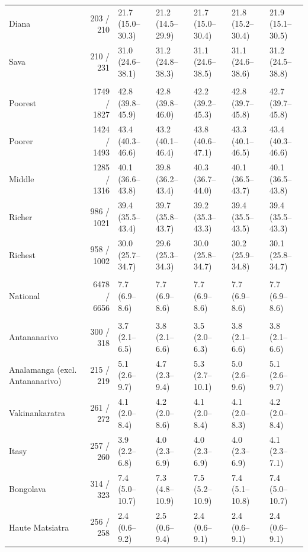 \documentclass[11pt,a4paper]{article}
\begin{document}
\begin{landscape}
\begin{longtable}{l|rlllll}
Diana & 203 / 210 & 21.7 (15.0–30.3) & 21.2 (14.5–29.9) & 21.7 (15.0–30.4) & 21.8 (15.2–30.4) & 21.9 (15.1–30.5) \\ 
Sava & 210 / 231 & 31.0 (24.6–38.1) & 31.2 (24.8–38.3) & 31.1 (24.6–38.5) & 31.1 (24.6–38.6) & 31.2 (24.5–38.8) \\ 
\midrule\addlinespace[2.5pt]
\multicolumn{7}{l}{Stunting — Wealth quintile} \\[2.5pt] 
\midrule\addlinespace[2.5pt]
Poorest & 1749 / 1827 & 42.8 (39.8–45.9) & 42.8 (39.8–46.0) & 42.2 (39.2–45.3) & 42.8 (39.7–45.8) & 42.7 (39.7–45.8) \\ 
Poorer & 1424 / 1493 & 43.4 (40.3–46.6) & 43.2 (40.1–46.4) & 43.8 (40.6–47.1) & 43.3 (40.1–46.5) & 43.4 (40.3–46.6) \\ 
Middle & 1285 / 1316 & 40.1 (36.6–43.8) & 39.8 (36.2–43.4) & 40.3 (36.7–44.0) & 40.1 (36.5–43.7) & 40.1 (36.5–43.8) \\ 
Richer & 986 / 1021 & 39.4 (35.5–43.4) & 39.7 (35.8–43.7) & 39.2 (35.3–43.3) & 39.4 (35.5–43.5) & 39.4 (35.5–43.3) \\ 
Richest & 958 / 1002 & 30.0 (25.7–34.7) & 29.6 (25.3–34.3) & 30.0 (25.8–34.7) & 30.2 (25.9–34.8) & 30.1 (25.8–34.7) \\ 
\midrule\addlinespace[2.5pt]
\multicolumn{7}{l}{Wasting — National} \\[2.5pt] 
\midrule\addlinespace[2.5pt]
National & 6478 / 6656 & 7.7 (6.9–8.6) & 7.7 (6.9–8.6) & 7.7 (6.9–8.6) & 7.7 (6.9–8.6) & 7.7 (6.9–8.6) \\ 
\midrule\addlinespace[2.5pt]
\multicolumn{7}{l}{Wasting — Region} \\[2.5pt] 
\midrule\addlinespace[2.5pt]
Antananarivo & 300 / 318 & 3.7 (2.1–6.5) & 3.8 (2.1–6.6) & 3.5 (2.0–6.3) & 3.8 (2.1–6.6) & 3.8 (2.1–6.6) \\ 
Analamanga (excl. Antananarivo) & 215 / 219 & 5.1 (2.6–9.7) & 4.7 (2.3–9.4) & 5.3 (2.7–10.1) & 5.0 (2.6–9.6) & 5.1 (2.6–9.7) \\ 
Vakinankaratra & 261 / 272 & 4.1 (2.0–8.4) & 4.2 (2.0–8.6) & 4.1 (2.0–8.4) & 4.1 (2.0–8.3) & 4.2 (2.0–8.4) \\ 
Itasy & 257 / 260 & 3.9 (2.2–6.8) & 4.0 (2.3–6.9) & 4.0 (2.3–6.9) & 4.0 (2.3–6.9) & 4.1 (2.3–7.1) \\ 
Bongolava & 314 / 323 & 7.4 (5.0–10.7) & 7.3 (4.8–10.9) & 7.5 (5.2–10.9) & 7.4 (5.1–10.8) & 7.4 (5.0–10.7) \\ 
Haute Matsiatra & 256 / 258 & 2.4 (0.6–9.2) & 2.5 (0.6–9.4) & 2.4 (0.6–9.1) & 2.4 (0.6–9.1) & 2.4 (0.6–9.1) \\ 

\end{longtable}
\end{landscape}
\end{document}
